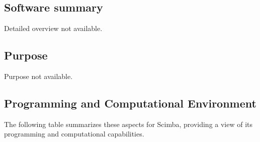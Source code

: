 \subsection{Software summary}
\label{sec:Scimba:summary}
Detailed overview not available.



\subsection{Purpose}
\label{sec:Scimba:purpose}
Purpose not available.

\subsection{Programming and Computational Environment}
\label{sec::Scimba:environment_capabilities}


The following table summarizes these aspects for Scimba, providing a  view of its programming and computational capabilities.

